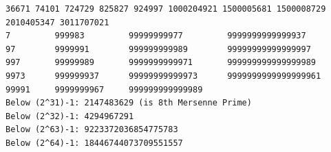 \begin{verbatim}
36671 74101 724729 825827 924997 1000204921 1500005681 1500008729 2010405347 3011707021
7         999983         99999999977         9999999999999937
97        9999991        999999999989        99999999999999997
997       99999989       9999999999971       999999999999999989
9973      999999937      99999999999973      9999999999999999961
99991     9999999967     999999999999989
Below (2^31)-1: 2147483629 (is 8th Mersenne Prime)
Below (2^32)-1: 4294967291
Below (2^63)-1: 9223372036854775783
Below (2^64)-1: 18446744073709551557
\end{verbatim}
